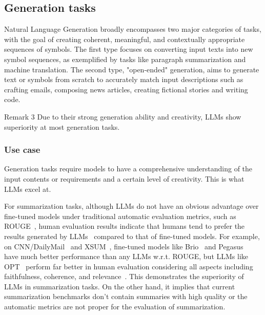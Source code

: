 \documentclass[manuscript,screen, nonacm]{acmart}
\begin{document}
\subsection{Generation tasks}
Natural Language Generation broadly encompasses two major categories of tasks, with the goal of creating coherent, meaningful, and contextually appropriate sequences of symbols. The first type focuses on converting input texts into new symbol sequences, as exemplified by tasks like paragraph summarization and machine translation. The second type, "open-ended" generation, aims to generate text or symbols from scratch to accurately match input descriptions such as crafting emails, composing news articles, creating fictional stories and writing code. 

\begin{applebox}{Remark 3}
    Due to their strong generation ability and creativity, LLMs show superiority at most generation tasks. 
\end{applebox}

\subsubsection{Use case} Generation tasks require models to have a comprehensive understanding of the input contents or requirements and a certain level of creativity. This is what LLMs excel at. 

For summarization tasks, although LLMs do not have an obvious advantage over fine-tuned models under traditional automatic evaluation metrics, such as ROUGE~\cite{lin2004rouge}, human evaluation results indicate that humans tend to prefer the results generated by LLMs~\cite{goyal2022news, zhang2023benchmarking} compared to that of fine-tuned models. For example, on CNN/DailyMail~\cite{nallapati2016abstractive} and XSUM~\cite{narayan2018don}, fine-tuned models like Brio~\cite{liu2022brio} and Pegasus~\cite{zhang2020pegasus} have much better performance than any LLMs w.r.t. ROUGE,  but LLMs like OPT~\cite{zhang2022opt} perform far better in human evaluation considering all aspects including faithfulness, coherence, and relevance~\cite{zhang2023benchmarking}. This demonstrates the superiority of LLMs in summarization tasks. On the other hand, it implies that current summarization benchmarks don't contain summaries with high quality or the automatic metrics are not proper for the evaluation of summarization.
\end{document}

